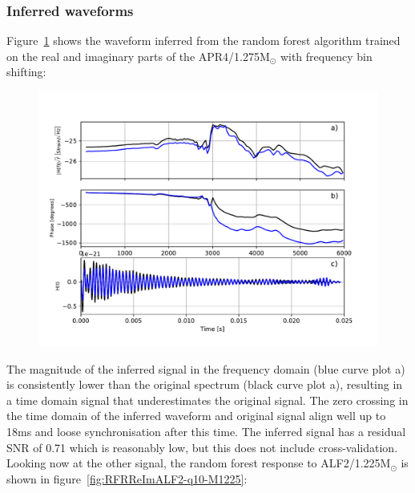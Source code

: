 \subsubsection{Inferred waveforms}
Figure~\ref{fig:RFRReImAPR4-q10-M1275} shows the waveform inferred from the random forest algorithm trained on the real and imaginary parts of the APR4/1.275M$_\odot$ with frequency bin shifting:
\begin{figure}[H]
	\includegraphics[width=15cm]{./img/RFRReImAPR4-q10-M1275.pdf} 
	\caption[\protect]{\protect}
	\label{fig:RFRReImAPR4-q10-M1275}
\end{figure}
The magnitude of the inferred signal in the frequency domain (blue curve plot a) is consistently lower than the original spectrum (black curve plot a), resulting in a time domain signal that underestimates the original signal. The zero crossing in the time domain of the inferred waveform and original signal align well up to 18ms and loose synchronisation after this time. The inferred signal has a residual SNR of 0.71 which is reasonably low, but this does not include cross-validation. Looking now at the other signal, the random forest response to ALF2/1.225M$_\odot$ is shown in figure~\ref{fig:RFRReImALF2-q10-M1225}:

